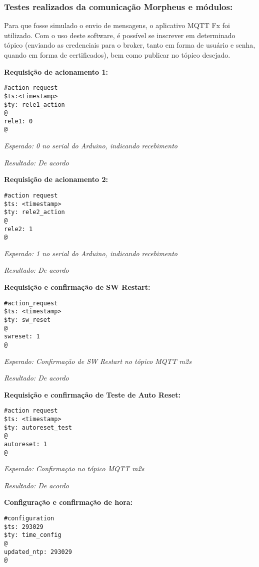 \subsubsection{Testes realizados da comunicação Morpheus e módulos:}

Para que fosse simulado o envio de mensagens, o aplicativo MQTT Fx foi utilizado. Com o uso deste software, é possível se inscrever em determinado tópico (enviando as credenciais para o broker, tanto em forma de usuário e senha, quando em forma de certificados), bem como publicar no tópico desejado.

\textbf{Requisição de acionamento 1:}
\begin{lstlisting}
#action_request
$ts:<timestamp>
$ty: rele1_action
@
rele1: 0
@
\end{lstlisting}

\textit{Esperado: 0 no serial do Arduino, indicando recebimento}

\textit{Resultado: De acordo}

\textbf{Requisição de acionamento 2:}
\begin{lstlisting}
#action request
$ts: <timestamp>
$ty: rele2_action
@
rele2: 1
@
\end{lstlisting}

\textit{Esperado: 1 no serial do Arduino, indicando recebimento}

\textit{Resultado: De acordo}

\textbf{Requisição e confirmação de SW Restart:}
\begin{lstlisting}
#action_request
$ts: <timestamp>
$ty: sw_reset
@
swreset: 1
@
\end{lstlisting}

\textit{Esperado: Confirmação de SW Restart no tópico MQTT m2s}

\textit{Resultado: De acordo}

\textbf{Requisição e confirmação de Teste de Auto Reset:}
\begin{lstlisting}
#action request
$ts: <timestamp>
$ty: autoreset_test
@
autoreset: 1
@
\end{lstlisting}

\textit{Esperado: Confirmação no tópico MQTT m2s}

\textit{Resultado: De acordo}

\textbf{Configuração e confirmação de hora:}
\begin{lstlisting}
#configuration
$ts: 293029
$ty: time_config
@
updated_ntp: 293029
@
\end{lstlisting}

